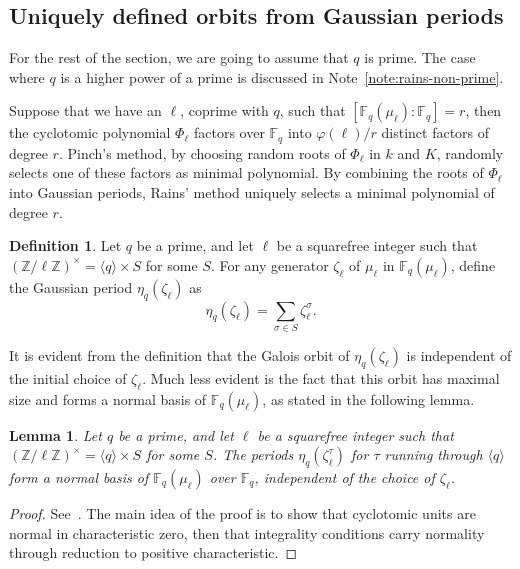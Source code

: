 \documentclass[12pt]{article}
\theoremstyle{plain}
\newtheorem{lemma}[theorem]{Lemma}
\theoremstyle{definition}
\newtheorem{definition}[theorem]{Definition}
\def\Z{\ensuremath{\mathbb{Z}}}
\def\F{\ensuremath{\mathbb{F}}}
\def\euler{\ensuremath{\varphi}}
\begin{document}
\subsection{Uniquely defined orbits from Gaussian periods}

For the rest of the section, we are going to assume that $q$ is
prime. The case where $q$ is a higher power of a prime is discussed in
Note~\ref{note:rains-non-prime}.

Suppose that we have an $\ell$, coprime with $q$, such that
$[\F_q(\mu_\ell):\F_q]=r$, then the cyclotomic polynomial $\Phi_\ell$
factors over $\F_q$ into $\euler(\ell)/r$ distinct factors of degree
$r$. Pinch's method, by choosing random roots of $\Phi_\ell$ in $k$
and $K$, randomly selects one of these factors as minimal polynomial.
By combining the roots of $\Phi_\ell$ into Gaussian periods, Rains'
method uniquely selects a minimal polynomial of degree $r$.

\begin{definition}
  Let $q$ be a prime, and let $\ell$ be a squarefree integer such that
  $(\Z/\ell\Z)^\times = \langle q\rangle \times S$ for some $S$.  For any
  generator $\zeta_\ell$ of $\mu_\ell$ in $\F_q(\mu_\ell)$, define the
  Gaussian period $\eta_q(\zeta_\ell)$ as
  \begin{equation}
    \eta_q(\zeta_\ell) = \sum_{\sigma\in S}{\zeta_\ell^{\sigma}}.
  \end{equation}
\end{definition}

It is evident from the definition that the Galois orbit of
$\eta_q(\zeta_\ell)$ is independent of the initial choice of
$\zeta_\ell$. Much less evident is the fact that this orbit has
maximal size and forms a normal basis of $\F_q(\mu_\ell)$, as stated
in the following lemma.

\begin{lemma}
  \label{th:gaussian}
  Let $q$ be a prime, and let $\ell$ be a squarefree integer such that
  $(\Z/\ell\Z)^\times = \langle q\rangle \times S$ for some $S$.  The
  periods $\eta_q(\zeta_\ell^\tau)$ for $\tau$ running through
  $\langle q\rangle$ form a normal basis of $\F_q(\mu_\ell)$ over
  $\F_q$, independent of the choice of $\zeta_\ell$.
\end{lemma}
\begin{proof}
  See~\cite[Main Theorem]{feisel1999normal}.
  The main idea of the proof is to show that cyclotomic units are
  normal in characteristic zero, then that integrality conditions
  carry normality through reduction to positive characteristic.
\end{proof}
\end{document}
